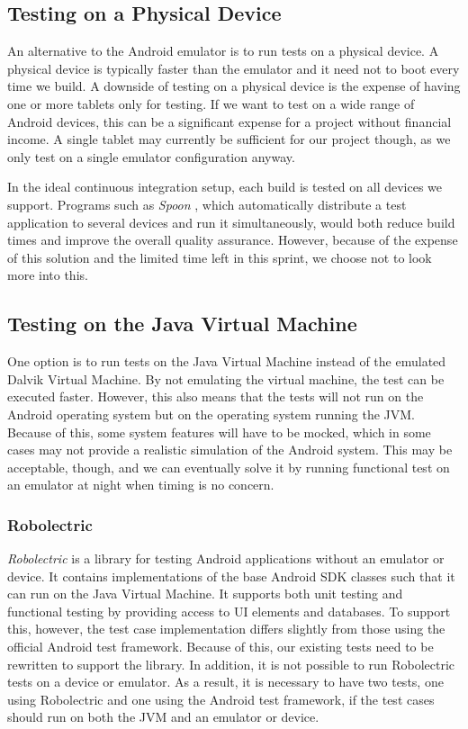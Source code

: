 \subsection{Testing on a Physical Device}
An alternative to the Android emulator is to run tests on a physical device. A physical device is typically faster than the emulator and it need not to boot every time we build. A downside of testing on a physical device is the expense of having one or more tablets only for testing. If we want to test on a wide range of Android devices, this can be a significant expense for a project without financial income. A single tablet may currently be sufficient for our project though, as we only test on a single emulator configuration anyway.

In the ideal continuous integration setup, each build is tested on all devices we support. Programs such as \emph{Spoon} \parencite{spoon2015}, which automatically distribute a test application to several devices and run it simultaneously, would both reduce build times and improve the overall quality assurance. However, because of the expense of this solution and the limited time left in this sprint, we choose not to look more into this.

\subsection{Testing on the Java Virtual Machine}
One option is to run tests on the Java Virtual Machine instead of the emulated Dalvik Virtual Machine. By not emulating the virtual machine, the test can be executed faster. However, this also means that the tests will not run on the Android operating system but on the operating system running the JVM\@. Because of this, some system features will have to be mocked, which in some cases may not provide a realistic simulation of the Android system. This may be acceptable, though, and we can eventually solve it by running functional test on an emulator at night when timing is no concern.

\subsubsection{Robolectric}
\emph{Robolectric} \parencite{robolectric2015} is a library for testing Android applications without an emulator or device. It contains implementations of the base Android SDK classes such that it can run on the Java Virtual Machine. It supports both unit testing and functional testing by providing access to UI elements and databases. To support this, however, the test case implementation differs slightly from those using the official Android test framework. Because of this, our existing tests need to be rewritten to support the library. In addition, it is not possible to run Robolectric tests on a device or emulator. As a result, it is necessary to have two tests, one using Robolectric and one using the Android test framework, if the test cases should run on both the JVM and an emulator or device.

